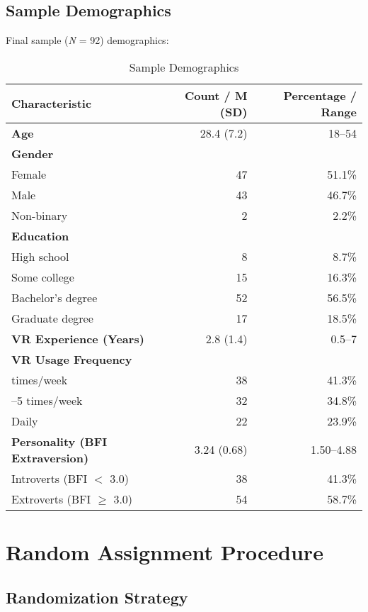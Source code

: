 \documentclass[12pt]{article}
\begin{document}
\subsection{Sample Demographics}

Final sample (\textit{N} = 92) demographics:

\begin{table}[h]
\centering
\caption{Sample Demographics}
\begin{tabular}{lrr}
\toprule
\textbf{Characteristic} & \textbf{Count / M (SD)} & \textbf{Percentage / Range} \\
\midrule
\textbf{Age} & 28.4 (7.2) & 18--54 \\
\midrule
\textbf{Gender} & & \\
\quad Female & 47 & 51.1\% \\
\quad Male & 43 & 46.7\% \\
\quad Non-binary & 2 & 2.2\% \\
\midrule
\textbf{Education} & & \\
\quad High school & 8 & 8.7\% \\
\quad Some college & 15 & 16.3\% \\
\quad Bachelor's degree & 52 & 56.5\% \\
\quad Graduate degree & 17 & 18.5\% \\
\midrule
\textbf{VR Experience (Years)} & 2.8 (1.4) & 0.5--7 \\
\midrule
\textbf{VR Usage Frequency} & & \\
\quad 3 times/week & 38 & 41.3\% \\
\quad 4--5 times/week & 32 & 34.8\% \\
\quad Daily & 22 & 23.9\% \\
\midrule
\textbf{Personality (BFI Extraversion)} & 3.24 (0.68) & 1.50--4.88 \\
\quad Introverts (BFI $<$ 3.0) & 38 & 41.3\% \\
\quad Extroverts (BFI $\geq$ 3.0) & 54 & 58.7\% \\
\bottomrule
\end{tabular}
\end{table}

\section{Random Assignment Procedure}

\subsection{Randomization Strategy}
\end{document}
